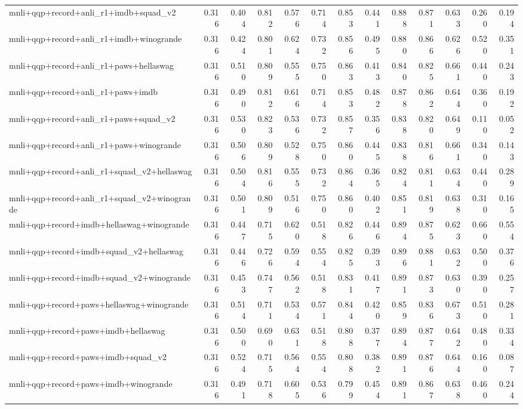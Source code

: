 \begin{table}[t]
\begin{tabular}{lrrrrrrrrrrrr}
    mnli+qqp+record+anli\_r1+imdb+squad\_v2 & 0.316 & 0.404 & 0.812 & 0.576 & 0.714 & 0.853 & 0.441 & 0.888 & 0.871 & 0.633 & 0.260 & 0.194 \\
    mnli+qqp+record+anli\_r1+imdb+winogrande & 0.316 & 0.424 & 0.801 & 0.624 & 0.732 & 0.856 & 0.495 & 0.880 & 0.866 & 0.626 & 0.520 & 0.351 \\
    mnli+qqp+record+anli\_r1+paws+hellaswag & 0.316 & 0.510 & 0.809 & 0.555 & 0.750 & 0.863 & 0.413 & 0.840 & 0.825 & 0.661 & 0.440 & 0.243 \\
    mnli+qqp+record+anli\_r1+paws+imdb & 0.316 & 0.490 & 0.812 & 0.616 & 0.714 & 0.853 & 0.482 & 0.878 & 0.862 & 0.644 & 0.360 & 0.192 \\
    mnli+qqp+record+anli\_r1+paws+squad\_v2 & 0.316 & 0.530 & 0.823 & 0.536 & 0.732 & 0.857 & 0.356 & 0.838 & 0.820 & 0.649 & 0.110 & 0.052 \\
    mnli+qqp+record+anli\_r1+paws+winogrande & 0.316 & 0.506 & 0.809 & 0.528 & 0.750 & 0.860 & 0.445 & 0.838 & 0.816 & 0.661 & 0.340 & 0.143 \\
    mnli+qqp+record+anli\_r1+squad\_v2+hellaswag & 0.316 & 0.504 & 0.816 & 0.555 & 0.732 & 0.864 & 0.365 & 0.824 & 0.811 & 0.634 & 0.440 & 0.289 \\
    mnli+qqp+record+anli\_r1+squad\_v2+winogrande & 0.316 & 0.501 & 0.809 & 0.516 & 0.750 & 0.860 & 0.402 & 0.851 & 0.819 & 0.638 & 0.310 & 0.165 \\
    mnli+qqp+record+imdb+hellaswag+winogrande & 0.316 & 0.447 & 0.715 & 0.620 & 0.518 & 0.826 & 0.446 & 0.894 & 0.875 & 0.623 & 0.660 & 0.554 \\
    mnli+qqp+record+imdb+squad\_v2+hellaswag & 0.316 & 0.446 & 0.726 & 0.594 & 0.554 & 0.825 & 0.393 & 0.896 & 0.881 & 0.632 & 0.500 & 0.376 \\
    mnli+qqp+record+imdb+squad\_v2+winogrande & 0.316 & 0.453 & 0.747 & 0.562 & 0.518 & 0.831 & 0.417 & 0.891 & 0.873 & 0.630 & 0.390 & 0.257 \\
    mnli+qqp+record+paws+hellaswag+winogrande & 0.316 & 0.514 & 0.711 & 0.534 & 0.571 & 0.844 & 0.420 & 0.859 & 0.836 & 0.673 & 0.510 & 0.281 \\
    mnli+qqp+record+paws+imdb+hellaswag & 0.316 & 0.500 & 0.690 & 0.631 & 0.518 & 0.808 & 0.377 & 0.894 & 0.877 & 0.642 & 0.480 & 0.334 \\
    mnli+qqp+record+paws+imdb+squad\_v2 & 0.316 & 0.524 & 0.715 & 0.564 & 0.554 & 0.808 & 0.382 & 0.891 & 0.876 & 0.644 & 0.160 & 0.087 \\
    mnli+qqp+record+paws+imdb+winogrande & 0.316 & 0.491 & 0.718 & 0.605 & 0.536 & 0.799 & 0.454 & 0.891 & 0.867 & 0.638 & 0.460 & 0.244 \\

\end{tabular}
\end{table}
